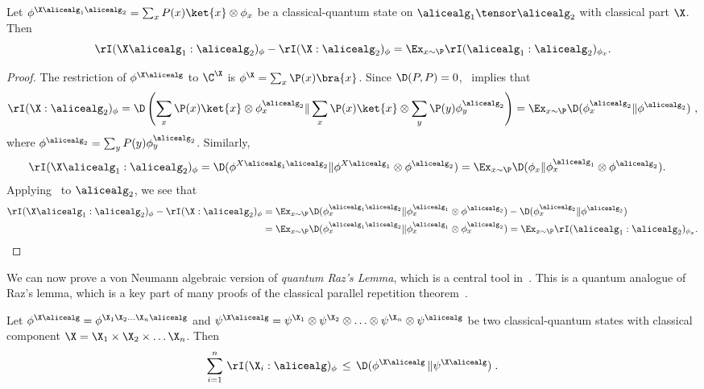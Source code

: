\begin{proposition}\label{prop:conditional_mutual_info}
	Let $\phi^{\X \alicealg_1 \alicealg_2} = \sum_{x} P(x) \ket{x} \otimes \phi_x$ be a classical-quantum state on $\alicealg_1 \tensor \alicealg_2$ with classical part $\X$. Then
	\begin{equation*}
		\rI(\X \alicealg_1 : \alicealg_2)_{\phi} - \rI(\X : \alicealg_2)_{\phi}  =  \Ex_{x \sim \P} \rI(\alicealg_1  : \alicealg_2)_{\phi_x}.
	\end{equation*}
\end{proposition}
\begin{proof}
	The restriction of $\phi^{\X \alicealg}$ to $\C^{\X}$ is $\phi^{\X} = \sum_x \P(x) \bra{x}$. Since $\D(P,P) = 0$,~ implies that 
	\begin{equation*}
		\rI(\X: \alicealg_2)_{\phi} = \D \left(\sum_x \P(x)  \ket{x} \otimes \phi_x^{\alicealg_2} \| \sum_x  \P(x) \ket{x} \otimes \sum_{y}\P(y)  \phi_y^{\alicealg_2} \right) = \Ex_{x \sim \P} \D (\phi_x^{\alicealg_2} \| \phi^{\alicealg_2})~,
	\end{equation*}
	where $\phi^{\alicealg_2} = \sum_y P(y) \phi_y^{\alicealg_2}$. Similarly, 
	\begin{align*}
		\rI(\X \alicealg_1 : \alicealg_2)_{\phi} = \D(\phi^{X \alicealg_1 \alicealg_2} \| \phi^{X \alicealg_1} \otimes \phi^{\alicealg_2}) &= \Ex_{x \sim \P} \D(\phi_x \| \phi_x^{\alicealg_1} \otimes \phi^{\alicealg_2}).
	\end{align*}
	Applying~ to $\alicealg_2$, we see that
	\begin{align*} 
		\rI(\X \alicealg_1 : \alicealg_2)_{\phi} - \rI(\X : \alicealg_2)_{\phi} &=\Ex_{x \sim \P} \D(\phi_x^{\alicealg_1 \alicealg_2} \| \phi_x^{\alicealg_1} \otimes \phi^{\alicealg_2} ) - \D(\phi_x^{\alicealg_2}  \| \phi^{\alicealg_2})
		\\&= \Ex_{x \sim \P} \D(\phi_x^{\alicealg_1 \alicealg_2} \| \phi_x^{\alicealg_1} \otimes \phi_x^{\alicealg_2} ) = \Ex_{x \sim \P} \rI(\alicealg_1  : \alicealg_2)_{\phi_x}.
	\end{align*}
\end{proof}
We can now prove a von Neumann algebraic version of \emph{quantum Raz's Lemma}, which is a central tool in~\cite{bavarianAnchoredParallelRepetition2021}. This is a quantum analogue of Raz's lemma, which is a key part of many proofs of the classical parallel repetition theorem~\cite{razParallelRepetitionTheorem1995a, holensteinParallelRepetitionSimplifications2009,barakStrongParallelRepetition2009}. 
\begin{lemma}
	\label{lem:quantum_raz}
	Let $\phi^{\X \alicealg}= \phi^{\X_1 \X_2 \ldots \X_n \alicealg}$ and $\psi^{\X \alicealg}=\psi^{\X_1}\otimes \psi^{\X_2}\otimes \ldots \otimes \psi^{\X_n} \otimes \psi^\alicealg$ be two classical-quantum states with classical component $\X= \X_1 \times \X_2 \times \ldots \X_n$. Then
	\begin{equation}
		\sum_{i=1}^n \, \rI (\X_i : \alicealg)_{\phi} \,\leq\, \D (\phi^{\X \alicealg} \,  \| \psi^{\X \alicealg})\;. 
	\end{equation}
\end{lemma}

